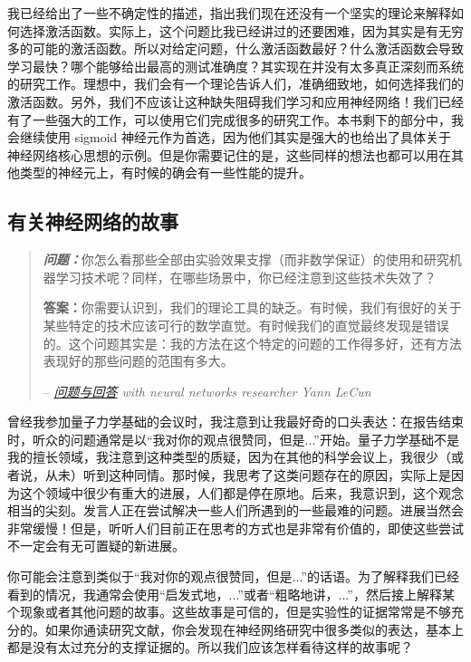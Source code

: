 我已经给出了一些不确定性的描述，指出我们现在还没有一个坚实的理论来解释如何选择激活函数。实际上，这个问题比我已经讲过的还要困难，因为其实是有无穷多的可能的激活函数。所以对给定问题，什么激活函数最好？什么激活函数会导致学习最快？哪个能够给出最高的测试准确度？其实现在并没有太多真正深刻而系统的研究工作。理想中，我们会有一个理论告诉人们，准确细致地，如何选择我们的激活函数。另外，我们不应该让这种缺失阻碍我们学习和应用神经网络！我们已经有了一些强大的工作，可以使用它们完成很多的研究工作。本书剩下的部分中，我会继续使用 sigmoid 神经元作为首选，因为他们其实是强大的也给出了具体关于神经网络核心思想的示例。但是你需要记住的是，这些同样的想法也都可以用在其他类型的神经元上，有时候的确会有一些性能的提升。


\subsection{有关神经网络的故事}

\begin{quote}
{\bfseries\itshape 问题：}你怎么看那些全部由实验效果支撑（而非数学保证）的使用和研究机器学习技术呢？同样，在哪些场景中，你已经注意到这些技术失效了？

\textbf{答案：}你需要认识到，我们的理论工具的缺乏。有时候，我们有很好的关于某些特定的技术应该可行的数学直觉。有时候我们的直觉最终发现是错误的。这个问题其实是：我的方法在这个特定的问题的工作得多好，还有方法表现好的那些问题的范围有多大。

-- {\itshape \href{http://www.reddit.com/r/MachineLearning/comments/25lnbt/ama_yann_lecun/chivdv7}{问题与回答} with neural networks researcher Yann LeCun}
\end{quote}

曾经我参加量子力学基础的会议时，我注意到让我最好奇的口头表达：在报告结束时，听众的问题通常是以“我对你的观点很赞同，但是...”开始。量子力学基础不是我的擅长领域，我注意到这种类型的质疑，因为在其他的科学会议上，我很少（或者说，从未）听到这种同情。那时候，我思考了这类问题存在的原因，实际上是因为这个领域中很少有重大的进展，人们都是停在原地。后来，我意识到，这个观念相当的尖刻。发言人正在尝试解决一些人们所遇到的一些最难的问题。进展当然会非常缓慢！但是，听听人们目前正在思考的方式也是非常有价值的，即使这些尝试不一定会有无可置疑的新进展。

你可能会注意到类似于“我对你的观点很赞同，但是...”的话语。为了解释我们已经看到的情况，我通常会使用“启发式地，...”或者“粗略地讲，...”，然后接上解释某个现象或者其他问题的故事。这些故事是可信的，但是实验性的证据常常是不够充分的。如果你通读研究文献，你会发现在神经网络研究中很多类似的表达，基本上都是没有太过充分的支撑证据的。所以我们应该怎样看待这样的故事呢？

